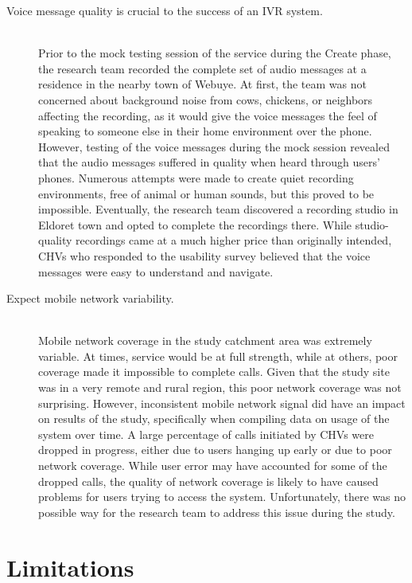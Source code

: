 \begin{description}
	\item[Voice message quality is crucial to the success of an IVR system.] \hfill \\
	Prior to the mock testing session of the service during the Create phase, the research team recorded the complete set of audio messages at a residence in the nearby town of Webuye. At first, the team was not concerned about background noise from cows, chickens, or neighbors affecting the recording, as it would give the voice messages the feel of speaking to someone else in their home environment over the phone. However, testing of the voice messages during the mock session revealed that the audio messages suffered in quality when heard through users' phones. Numerous attempts were made to create quiet recording environments, free of animal or human sounds, but this proved to be impossible. Eventually, the research team discovered a recording studio in Eldoret town and opted to complete the recordings there. While studio-quality recordings came at a much higher price than originally intended, CHVs who responded to the usability survey believed that the voice messages were easy to understand and navigate. 

	\item[Expect mobile network variability.] \hfill \\
	Mobile network coverage in the study catchment area was extremely variable. At times, service would be at full strength, while at others, poor coverage made it impossible to complete calls. Given that the study site was in a very remote and rural region, this poor network coverage was not surprising. However, inconsistent mobile network signal did have an impact on results of the study, specifically when compiling data on usage of the system over time. A large percentage of calls initiated by CHVs were dropped in progress, either due to users hanging up early or due to poor network coverage. While user error may have accounted for some of the dropped calls, the quality of network coverage is likely to have caused problems for users trying to access the system. Unfortunately, there was no possible way for the research team to address this issue during the study.
\end{description}


\section{Limitations}

